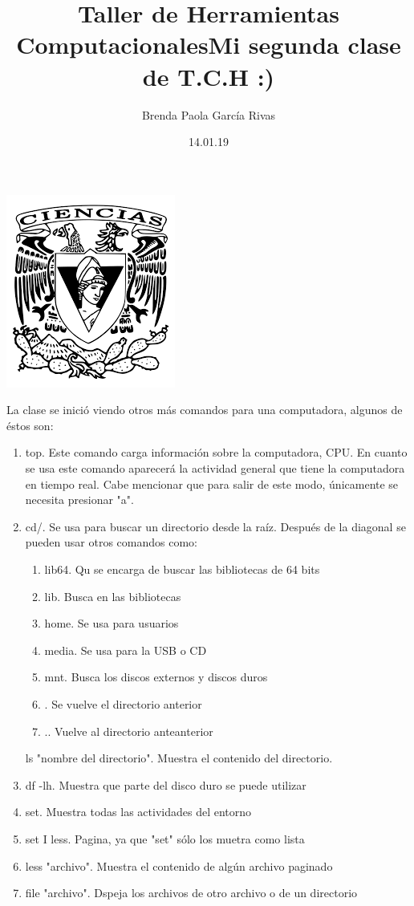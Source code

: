 \documentclass[letterpaper, 12pt, oneside]{article}
\title{\huge\color{blue}Taller de Herramientas Computacionales}
\author{Brenda Paola García Rivas}
\date{14.01.19}
\begin{document}
	\maketitle
	\begin{center}
		\includegraphics[scale=0.95]{1.png}
	\end{center}
	\newpage
	\title{Mi segunda clase de T.C.H :)\\}
	La clase se inició viendo otros más comandos para una computadora, algunos de éstos son:
	\begin{enumerate}
		\item 
		top. Este comando carga información sobre la computadora, CPU. En cuanto se usa este comando aparecerá la actividad general que tiene la computadora en tiempo real. Cabe mencionar que para salir de este modo, únicamente se necesita presionar "a".
		\item 
		cd/. Se usa para buscar un directorio desde la raíz. Después de la diagonal se pueden usar otros comandos como:
		\begin{enumerate}
			\item 
			lib64. Qu se encarga de buscar las bibliotecas de 64 bits
			\item 
			lib. Busca en las bibliotecas
			\item 
			home. Se usa para usuarios
			\item 
			media. Se usa para la USB o CD
			\item 
			mnt. Busca los discos externos y discos duros
			\item 
			. Se vuelve el directorio anterior
			\item 
			.. Vuelve al directorio anteanterior
		\end{enumerate}
		ls "nombre del directorio". Muestra el contenido del directorio.
		\item
	 	df -lh. Muestra que parte del disco duro se puede utilizar
	 	\item 
	 	set. Muestra todas las actividades del entorno
	 	\item 
	 	set I less. Pagina, ya que "set" sólo los muetra como lista
	 	\item 
	 	less "archivo". Muestra el contenido de algún archivo paginado
	 	\item 
	 	file "archivo". Dspeja los archivos de otro archivo o de un directorio
	\end{enumerate}
\end{document}
